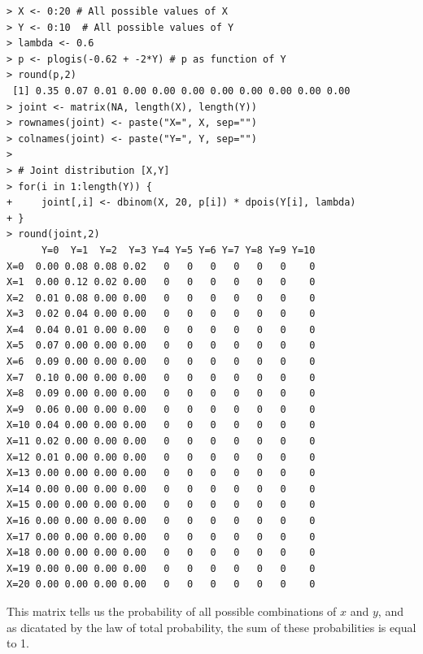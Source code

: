 \begin{verbatim}
> X <- 0:20 # All possible values of X
> Y <- 0:10  # All possible values of Y
> lambda <- 0.6
> p <- plogis(-0.62 + -2*Y) # p as function of Y
> round(p,2)
 [1] 0.35 0.07 0.01 0.00 0.00 0.00 0.00 0.00 0.00 0.00 0.00
> joint <- matrix(NA, length(X), length(Y))
> rownames(joint) <- paste("X=", X, sep="")
> colnames(joint) <- paste("Y=", Y, sep="")
>
> # Joint distribution [X,Y]
> for(i in 1:length(Y)) {
+     joint[,i] <- dbinom(X, 20, p[i]) * dpois(Y[i], lambda)
+ }
> round(joint,2)
      Y=0  Y=1  Y=2  Y=3 Y=4 Y=5 Y=6 Y=7 Y=8 Y=9 Y=10
X=0  0.00 0.08 0.08 0.02   0   0   0   0   0   0    0
X=1  0.00 0.12 0.02 0.00   0   0   0   0   0   0    0
X=2  0.01 0.08 0.00 0.00   0   0   0   0   0   0    0
X=3  0.02 0.04 0.00 0.00   0   0   0   0   0   0    0
X=4  0.04 0.01 0.00 0.00   0   0   0   0   0   0    0
X=5  0.07 0.00 0.00 0.00   0   0   0   0   0   0    0
X=6  0.09 0.00 0.00 0.00   0   0   0   0   0   0    0
X=7  0.10 0.00 0.00 0.00   0   0   0   0   0   0    0
X=8  0.09 0.00 0.00 0.00   0   0   0   0   0   0    0
X=9  0.06 0.00 0.00 0.00   0   0   0   0   0   0    0
X=10 0.04 0.00 0.00 0.00   0   0   0   0   0   0    0
X=11 0.02 0.00 0.00 0.00   0   0   0   0   0   0    0
X=12 0.01 0.00 0.00 0.00   0   0   0   0   0   0    0
X=13 0.00 0.00 0.00 0.00   0   0   0   0   0   0    0
X=14 0.00 0.00 0.00 0.00   0   0   0   0   0   0    0
X=15 0.00 0.00 0.00 0.00   0   0   0   0   0   0    0
X=16 0.00 0.00 0.00 0.00   0   0   0   0   0   0    0
X=17 0.00 0.00 0.00 0.00   0   0   0   0   0   0    0
X=18 0.00 0.00 0.00 0.00   0   0   0   0   0   0    0
X=19 0.00 0.00 0.00 0.00   0   0   0   0   0   0    0
X=20 0.00 0.00 0.00 0.00   0   0   0   0   0   0    0
\end{verbatim}
This matrix tells us the probability of all possible combinations of
$x$ and $y$, and as dicatated by the law of total probability, the sum
of these probabilities is equal to 1.

